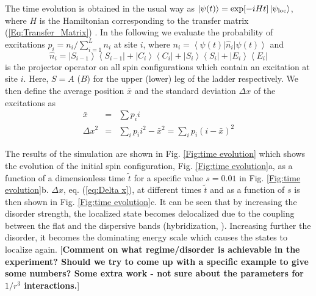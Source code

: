\documentclass[prl,aps,twocolumn,showpacs,superscriptaddress,longbibliography]{revtex4-1}
\newcommand{\lan}{\left\langle}
\newcommand{\ran}{\right\rangle}
\newcommand{\ket}[1]{\left| #1 \ran}
\newcommand{\bra}[1]{\lan #1 \right|}
\begin{document}
The time evolution is obtained in the usual way as $\ket{\psi(t)} = {\rm exp}[-i H t] \ket{\psi_{\rm loc}}$, where $H$ is the Hamiltonian corresponding to the transfer matrix (\ref{Eq:Transfer_Matrix}) \cite{SM}. In the following we evaluate the probability of excitations $p_i = n_i/\sum_{i=1}^{L} n_i$ at site $i$, where $n_i = \bra{\psi(t)} \hat{n}_i \ket{\psi(t)}$ and
\begin{equation}
	\hat{n}_i =
		\ket{S_{i-1}}\bra{S_{i-1}} + \ket{C_{i}}\bra{C_{i}} + \ket{S_{i}}\bra{S_{i}} + \ket{E_{i}}\bra{E_{i}}
\end{equation}
is the projector operator on all spin configurations which contain an excitation at site $i$. Here, $S=A$ ($B$) for the upper (lower) leg of the ladder respectively. We then define the average position $\bar{x}$ and the standard deviation $\Delta x$ of the excitations as
\begin{eqnarray}
	\bar{x} &=& \sum p_i i \\
	\Delta x^2 &=& \sum_i p_i i^2 - \bar{x}^2 = \sum_i p_i (i-\bar{x})^2
	\label{eq:Delta x}
\end{eqnarray}

The results of the simulation are shown in Fig. \ref{Fig:time evolution} which shows the evolution of the initial spin configuration, Fig. \ref{Fig:time evolution}a, as a function of a dimensionless time $\tilde{t}$ for a specific value $s=0.01$ in Fig. \ref{Fig:time evolution}b. $\Delta x$, eq. (\ref{eq:Delta x}), at different times $\tilde{t}$ and as a function of $s$ is then shown in Fig. \ref{Fig:time evolution}c. It can be seen that by increasing the disorder strength, the localized state becomes delocalized due to the coupling between the flat and the dispersive bands (hybridization, \cite{Leykam2017}). Increasing further the disorder, it becomes the dominating energy scale which causes the states to localize again. [{\bf Comment on what regime/disorder is achievable in the experiment? Should we try to come up with a specific example to give some numbers? Some extra work - not sure about the parameters for $1/r^3$ interactions.}]
\end{document}
